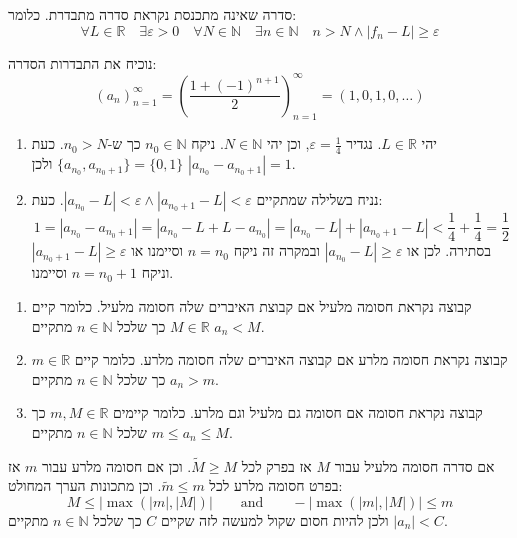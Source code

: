 \documentclass{tstextbook}
\begin{document}
\begin{definition}
סדרה שאינה מתכנסת נקראת סדרה מתבדרת. כלומר:
$$\forall L \in \mathbb{R}\quad \exists\varepsilon>0\quad \forall N \in \mathbb{N}\quad \exists n\in \mathbb{N}\quad n>N \land|f_{n}-L|\geq\varepsilon$$

\end{definition}
\begin{example}
נוכיח את התבדרות הסדרה:
$$(a_n)_{n=1}^\infty =\left( \frac{1+(-1)^{n+1}}{2} \right)_{n=1}^\infty =\left( 1,0,1,0,\dots \right)$$

  \begin{enumerate}
    \item יהי \(L \in \mathbb{R}\). נגדיר \(\varepsilon=\frac{1}{4}\), וכן יהי \(N \in \mathbb{N}\). ניקח \(n_{0} \in \mathbb{N}\) כך ש-\(n_{0}>N\). כעת \(\{ a_{n_{0}},a_{n_{0}+1} \}=\{ 0,1 \}\) ולכן \(|a_{n_{0}}-a_{n_{0}+1}|=1\). 


    \item נניח בשלילה שמתקיים \(|a_{n_{0}}-L|<\varepsilon \land|a_{n_{0}+1}-L|<\varepsilon\). כעת: 
$$1=|a_{n_{0}}-a_{n_{0}+1}|=|a_{n_{0}}-L+L-a_{n_{0}}|=|a_{n_{0}}-L|+|a_{n_{0}+1}-L|<\frac{1}{4}+\frac{1}{4}=\frac{1}{2}$$
בסתירה. לכן או \(|a_{n_{0}}-L|\geq\varepsilon\) ובמקרה זה ניקח \(n=n_{0}\) וסיימנו או \(|a_{n_{0}+1}-L|\geq \varepsilon\) וניקח \(n=n_{0}+1\) וסיימנו.


  \end{enumerate}
\end{example}
\begin{definition}
  \begin{enumerate}
    \item קבוצה נקראת חסומה מלעיל אם קבוצת האיברים שלה חסומה מלעיל. כלומר קיים \(M\in \mathbb{R}\) כך שלכל \(n \in \mathbb{N}\) מתקיים \(a_{n}<M\). 


    \item קבוצה נקראת חסומה מלרע אם קבוצה האיברים שלה חסומה מלרע. כלומר קיים \(m \in \mathbb{R}\) כך שלכל \(n \in \mathbb{N}\) מתקיים \(a_{n}>m\). 


    \item קבוצה נקראת חסומה אם חסומה גם מלעיל וגם מלרע. כלומר קיימים \(m,M\in \mathbb{R}\) כך שלכל \(n \in \mathbb{N}\) מתקיים \(m\leq a_{n}\leq M\). 


  \end{enumerate}
\end{definition}
\begin{remark}
אם סדרה חסומה מלעיל עבור \(M\) אז בפרק לכל \(\tilde{M}\geq M\). וכן אם חסומה מלרע עבור \(m\) אז בפרט חסומה מלרע לכל \(\tilde{m}\leq m\). וכן מתכונות הערך המחולט:
$$M\leq|\max (|m|,|M|)|\qquad \text{and}\qquad -|\max(|m|,|M|)|\leq m $$
ולכן להיות חסום שקול למעשה לזה שקיים \(C\) כך שלכל \(n \in \mathbb{N}\) מתקיים \(|a_{n}|<C\).

\end{remark}
\end{document}
